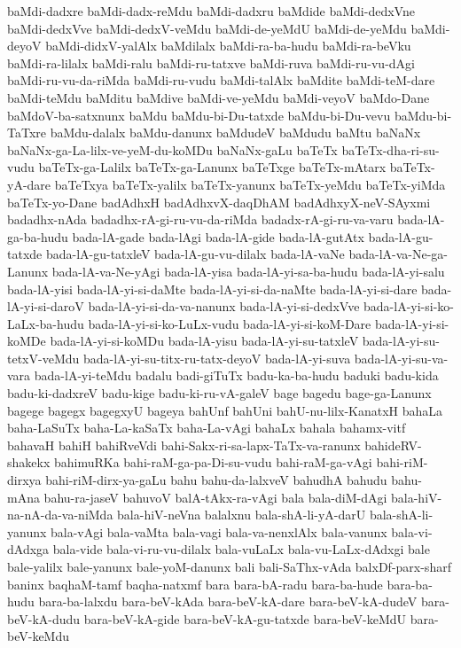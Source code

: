 {baMdi-dadxre
baMdi-dadx-reMdu
baMdi-dadxru
baMdide
baMdi-dedxVne
baMdi-dedxVve
baMdi-dedxV-veMdu
baMdi-de-yeMdU
baMdi-de-yeMdu
baMdi-deyoV
baMdi-didxV-yalAlx
baMdilalx
baMdi-ra-ba-hudu
baMdi-ra-beVku
baMdi-ra-lilalx
baMdi-ralu
baMdi-ru-tatxve
baMdi-ruva
baMdi-ru-vu-dAgi
baMdi-ru-vu-da-riMda
baMdi-ru-vudu
baMdi-talAlx
baMdite
baMdi-teM-dare
baMdi-teMdu
baMditu
baMdive
baMdi-ve-yeMdu
baMdi-veyoV
baMdo-Dane
baMdoV-ba-satxnunx
baMdu
baMdu-bi-Du-tatxde
baMdu-bi-Du-vevu
baMdu-bi-TaTxre
baMdu-dalalx
baMdu-danunx
baMdudeV
baMdudu
baMtu
baNaNx
baNaNx-ga-La-lilx-ve-yeM-du-koMDu
baNaNx-gaLu
baTeTx
baTeTx-dha-ri-su-vudu
baTeTx-ga-Lalilx
baTeTx-ga-Lanunx
baTeTxge
baTeTx-mAtarx
baTeTx-yA-dare
baTeTxya
baTeTx-yalilx
baTeTx-yanunx
baTeTx-yeMdu
baTeTx-yiMda
baTeTx-yo-Dane
badAdhxH
badAdhxvX-daqDhAM
badAdhxyX-neV-SAyxmi
badadhx-nAda
badadhx-rA-gi-ru-vu-da-riMda
badadx-rA-gi-ru-va-varu
bada-lA-ga-ba-hudu
bada-lA-gade
bada-lAgi
bada-lA-gide
bada-lA-gutAtx
bada-lA-gu-tatxde
bada-lA-gu-tatxleV
bada-lA-gu-vu-dilalx
bada-lA-vaNe
bada-lA-va-Ne-ga-Lanunx
bada-lA-va-Ne-yAgi
bada-lA-yisa
bada-lA-yi-sa-ba-hudu
bada-lA-yi-salu
bada-lA-yisi
bada-lA-yi-si-daMte
bada-lA-yi-si-da-naMte
bada-lA-yi-si-dare
bada-lA-yi-si-daroV
bada-lA-yi-si-da-va-nanunx
bada-lA-yi-si-dedxVve
bada-lA-yi-si-ko-LaLx-ba-hudu
bada-lA-yi-si-ko-LuLx-vudu
bada-lA-yi-si-koM-Dare
bada-lA-yi-si-koMDe
bada-lA-yi-si-koMDu
bada-lA-yisu
bada-lA-yi-su-tatxleV
bada-lA-yi-su-tetxV-veMdu
bada-lA-yi-su-titx-ru-tatx-deyoV
bada-lA-yi-suva
bada-lA-yi-su-va-vara
bada-lA-yi-teMdu
badalu
badi-giTuTx
badu-ka-ba-hudu
baduki
badu-kida
badu-ki-dadxreV
badu-kige
badu-ki-ru-vA-galeV
bage
bagedu
bage-ga-Lanunx
bagege
bagegx
bagegxyU
bageya
bahUnf
bahUni
bahU-nu-lilx-KanatxH
bahaLa
baha-LaSuTx
baha-La-kaSaTx
baha-La-vAgi
bahaLx
bahala
bahamx-vitf
bahavaH
bahiH
bahiRveVdi
bahi-Sakx-ri-sa-lapx-TaTx-va-ranunx
bahideRV-shakekx
bahimuRKa
bahi-raM-ga-pa-Di-su-vudu
bahi-raM-ga-vAgi
bahi-riM-dirxya
bahi-riM-dirx-ya-gaLu
bahu
bahu-da-lalxveV
bahudhA
bahudu
bahu-mAna
bahu-ra-jaseV
bahuvoV
balA-tAkx-ra-vAgi
bala
bala-diM-dAgi
bala-hiV-na-nA-da-va-niMda
bala-hiV-neVna
balalxnu
bala-shA-li-yA-darU
bala-shA-li-yanunx
bala-vAgi
bala-vaMta
bala-vagi
bala-va-nenxlAlx
bala-vanunx
bala-vi-dAdxga
bala-vide
bala-vi-ru-vu-dilalx
bala-vuLaLx
bala-vu-LaLx-dAdxgi
bale
bale-yalilx
bale-yanunx
bale-yoM-danunx
bali
bali-SaThx-vAda
balxDf-parx-sharf
baninx
baqhaM-tamf
baqha-natxmf
bara
bara-bA-radu
bara-ba-hude
bara-ba-hudu
bara-ba-lalxdu
bara-beV-kAda
bara-beV-kA-dare
bara-beV-kA-dudeV
bara-beV-kA-dudu
bara-beV-kA-gide
bara-beV-kA-gu-tatxde
bara-beV-keMdU
bara-beV-keMdu
}

